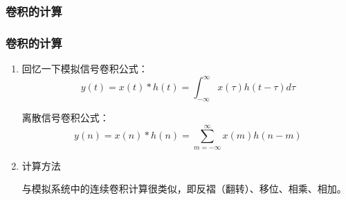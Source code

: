 \documentclass[notheorems,compress,mathserif,table]{beamer}
\begin{document}
\subsubsection*{卷积的计算}

\begin{frame}[shrink]\frametitle{卷积的计算}%

%
      \begin{enumerate}
          \item
              回忆一下模拟信号卷积公式：
              $$y(t) = x(t)*h(t) = \int_{-\infty}^{\infty}x(\tau)h(t-\tau)d\tau $$\par
              离散信号卷积公式：
              $$y(n) = x(n)*h(n) = \sum_{m=-\infty}^{\infty}x(m)h(n-m)$$\par
          \item 计算方法 \par
              \qquad 与模拟系统中的连续卷积计算很类似，即反褶（翻转）、移位、相乘、相加。
      \end{enumerate}
\end{frame}
\end{document}
